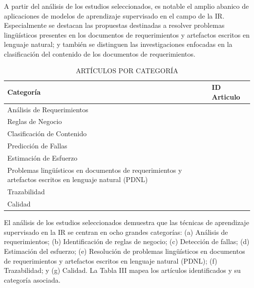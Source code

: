 \documentclass[journal]{IEEEtran}
\begin{document}
A partir del análisis de los estudios seleccionados, es notable el amplio abanico de aplicaciones de modelos de aprendizaje supervisado en el campo de la IR. Especialmente se destacan las propuestas destinadas a resolver problemas lingüísticos presentes en los documentos de requerimientos y artefactos escritos en lenguaje natural; y también se distinguen las investigaciones enfocadas en la clasificación del contenido de los documentos de requerimientos.


\begin{table}[!t]
\renewcommand{\arraystretch}{1.3}
\caption{ARTÍCULOS POR CATEGORÍA}
\label{tabla3}
\centering
\begin{tabular}{p{3cm}p{4.5cm}}
\hline
\hline
Categoría & ID Articulo \\
\hline
Análisis de Requerimientos & \cite{Wang2016} \\ \cline{1-2}
Reglas de Negocio & \cite{sharma2014automated} \\ \cline{1-2}
Clasificación de Contenido & \cite{li2017identifying,Jindal20162027,kurtanovic2017automatically,dekhtyar2017re,abad2017works,Slankas2013,Slankas2013a,Merten2016,winkler2016automatic} \\ \cline{1-2}
Predicción de Fallas & \cite{del2017stability,dargan2016systems,fitzgerald2012early,malhotra2017exploratory,del2011requirement} \\ \cline{1-2}
Estimación de Esfuerzo & \cite{Abdukalykov2011158} \\ \cline{1-2}
Problemas lingüísticos en documentos de requerimientos y
artefactos escritos en lenguaje natural (PDNL) & \cite{yang2010extending,yang2012speculative,Knauss201685,Yang2011,Ott2013,nikora2009automated} \\ \cline{1-2}
Trazabilidad & \cite{Li201725,Cleland-Huang2010,gokyer2008non,Mills2017,Sardinha2013,AtasM.2018} \\ \cline{1-2}
Calidad & \cite{Parra2015180,Hayes2015,Hussain2007} \\
\hline \hline                                                                                                    
\end{tabular}
\end{table}









El análisis de los estudios seleccionados demuestra que las técnicas de aprendizaje supervisado en la IR se centran en ocho grandes categorías: (a) Análisis de requerimientos; (b) Identificación de reglas de negocio; (c) Detección de fallas; (d) Estimación del esfuerzo; (e) Resolución de problemas lingüísticos en documentos de requerimientos y artefactos escritos en lenguaje natural (PDNL); (f) Trazabilidad; y (g) Calidad. La Tabla III mapea los artículos identificados y su categoría asociada. 
\end{document}
